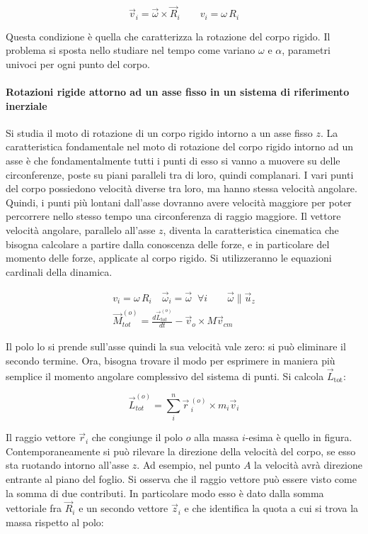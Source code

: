 \[
	\vec{v}_i =\vec{\omega} \times \vec{R}_i \qquad v_i=\omega \,R_i
\]

Questa condizione è quella che caratterizza la rotazione del corpo rigido. Il problema si sposta nello studiare nel tempo come variano $\omega$ e $\alpha$, parametri univoci per ogni punto del corpo.

\paragraph{Rotazioni rigide attorno ad un asse fisso in un sistema di riferimento inerziale} Si studia il moto di rotazione di un corpo rigido intorno a un asse fisso $z$. La caratteristica fondamentale nel moto di rotazione del corpo rigido intorno ad un asse è che fondamentalmente tutti i punti di esso si vanno a muovere su delle circonferenze, poste su piani paralleli tra di loro, quindi complanari. I vari punti del corpo possiedono velocità diverse tra loro, ma hanno stessa velocità angolare. Quindi, i punti più lontani dall'asse dovranno avere velocità maggiore per poter percorrere nello stesso tempo una circonferenza di raggio maggiore. Il vettore velocità angolare, parallelo all'asse $z$, diventa la caratteristica cinematica che bisogna calcolare a partire dalla conoscenza delle forze, e in particolare del momento delle forze, applicate al corpo rigido. Si utilizzeranno le equazioni cardinali della dinamica.

\begin{gather*}
	v_i = \omega \, R_i \quad \vec{\omega}_i = \vec{\omega} \;\; \forall i \qquad \vec{\omega} \parallel \vec{u}_z \\
	\vec{M}_{tot}^{(o)} = \frac{ d\vec{L}_{tot}^{(o)}  }{dt} - \vec{v}_o\times M\vec{v}_{cm}
\end{gather*}

Il polo lo si prende sull'asse quindi la sua velocità vale zero: si può eliminare il secondo termine. Ora, bisogna trovare il modo per esprimere in maniera più semplice il momento angolare complessivo del sistema di punti. Si calcola $\vec{L}_\text{tot}$:

\[
	\vec{L}_{tot}^{(o)} = \sum_i^n \vec{r}\,^{(o)}_i \times m_i\vec{v}_i
\]

Il raggio vettore $\vec{r}_i$ che congiunge il polo $o$ alla massa $i$-esima è quello in figura. Contemporaneamente si può rilevare la direzione della velocità del corpo, se esso sta ruotando intorno all'asse $z$. Ad esempio,
nel punto $A$ la velocità avrà direzione entrante al piano del foglio. Si osserva che il raggio vettore può essere visto come la somma di due contributi. In particolare modo esso è dato dalla somma vettoriale fra $\vec{R}_i$ e un secondo vettore $\vec{z}_i$ e che identifica la quota a cui si trova la massa rispetto al polo:

